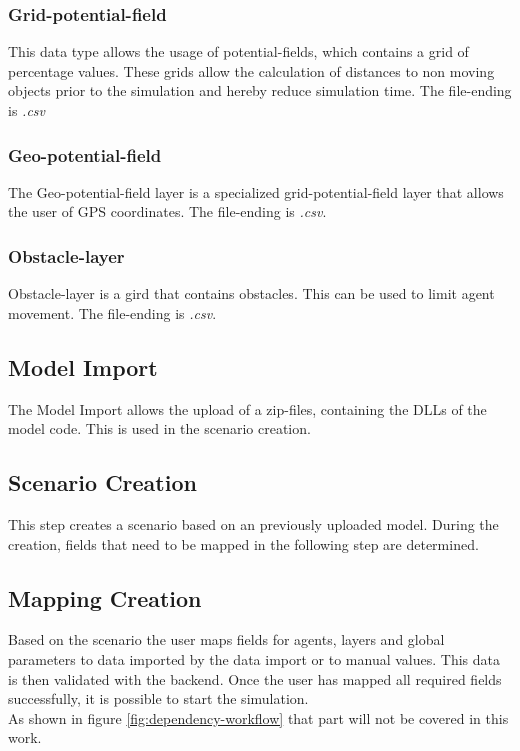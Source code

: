 \subsubsection{Grid-potential-field}
This data type allows the usage of potential-fields, which contains a grid of percentage values. These grids allow the calculation of distances to non moving objects prior to the simulation and hereby reduce simulation time. The file-ending is \textit{.csv}

\subsubsection{Geo-potential-field}
The Geo-potential-field layer is a specialized grid-potential-field layer that allows the user of GPS coordinates. The file-ending is \textit{.csv}.

\subsubsection{Obstacle-layer}
Obstacle-layer is a gird that contains obstacles. This can be used to limit agent movement. The file-ending is \textit{.csv}.


\subsection{Model Import}
The Model Import allows the upload of a zip-files, containing the DLLs of the model code. This is used in the scenario creation.


\subsection{Scenario Creation}
This step creates a scenario based on an previously uploaded model. During the creation, fields that need to be mapped in the following step are determined.


\subsection{Mapping Creation}
Based on the scenario the user maps fields for agents, layers and global parameters to data imported by the data import or to manual values. This data is then validated with the backend. Once the user has mapped all required fields successfully, it is possible to start the simulation.\\
As shown in figure \ref{fig:dependency-workflow} that part will not be covered in this work.



